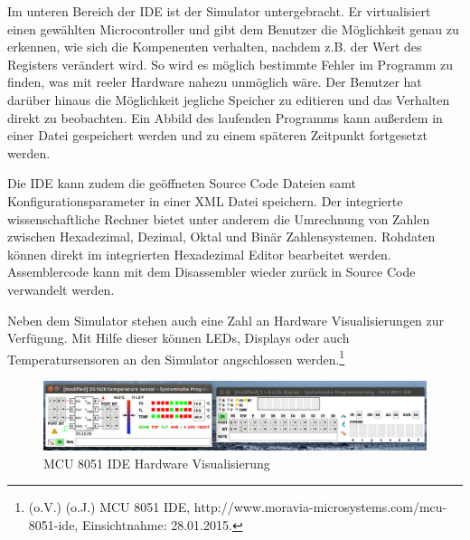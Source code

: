 Im unteren Bereich der \ac{IDE} ist der Simulator untergebracht. Er
virtualisiert einen gewählten Microcontroller und gibt dem Benutzer die
Möglichkeit genau zu erkennen, wie sich die Kompenenten verhalten,
nachdem z.B. der Wert des Registers verändert wird. So wird es möglich
bestimmte Fehler im Programm zu finden, was mit reeler Hardware nahezu
unmöglich wäre. Der Benutzer hat darüber hinaus die Möglichkeit jegliche
Speicher zu editieren und das Verhalten direkt zu beobachten. Ein Abbild
des laufenden Programms kann außerdem in einer Datei gespeichert werden
und zu einem späteren Zeitpunkt fortgesetzt werden.

Die \ac{IDE} kann zudem die geöffneten Source Code Dateien samt
Konfigurationsparameter in einer \ac{XML} Datei speichern. Der
integrierte wissenschaftliche Rechner bietet unter anderem die
Umrechnung von Zahlen zwischen Hexadezimal, Dezimal, Oktal und Binär
Zahlensystemen. Rohdaten können direkt im integrierten Hexadezimal
Editor bearbeitet werden. Assemblercode kann mit dem Disassembler wieder
zurück in Source Code verwandelt werden.

Neben dem Simulator stehen auch eine Zahl an Hardware Visualisierungen
zur Verfügung. Mit Hilfe dieser können \ac{LED}s, Displays oder auch
Temperatursensoren an den Simulator angschlossen werden.\footnote{(o.V.)
  (o.J.) MCU 8051 IDE, http://www.moravia-microsystems.com/mcu-8051-ide,
  Einsichtnahme: 28.01.2015.}

\begin{figure}[htbp]
\centering
\includegraphics{images/display-temp.png}
\caption{MCU 8051 IDE Hardware Visualisierung}
\end{figure}